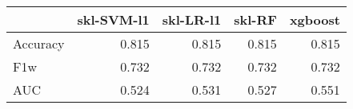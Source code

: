 \begin{tabular}{lrrrr}
\toprule
{} &  skl-SVM-l1 &  skl-LR-l1 &  skl-RF &  xgboost \\
\midrule
Accuracy &       0.815 &      0.815 &   0.815 &    0.815 \\
F1w      &       0.732 &      0.732 &   0.732 &    0.732 \\
AUC      &       0.524 &      0.531 &   0.527 &    0.551 \\
\bottomrule
\end{tabular}
